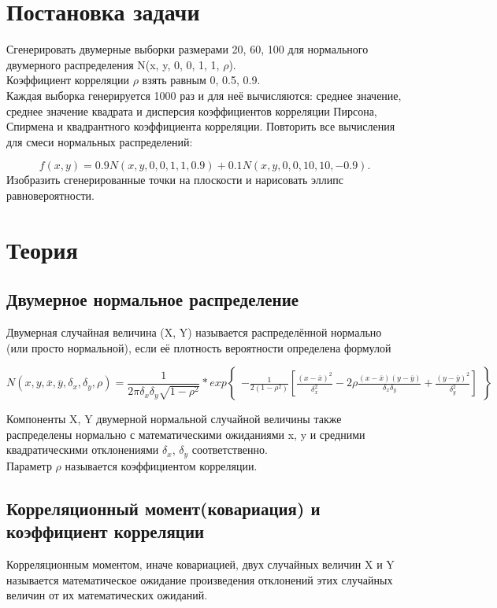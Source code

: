 \documentclass[a4]{article}
\begin{document}
	
	\newpage
	\tableofcontents{}
	\newpage
	\listoffigures
	\newpage
	\listoftables
	\newpage
	
	
	\section{Постановка задачи}
		Сгенерировать двумерные выборки размерами 20, 60, 100 для нормального двумерного распределения N(x, y, 0, 0, 1, 1, $\rho$).\\
		Коэффициент корреляции $\rho$ взять равным 0, 0.5, 0.9.\\
		Каждая выборка генерируется 1000 раз и для неё вычисляются: среднее значение, среднее значение квадрата и дисперсия коэффициентов корреляции Пирсона, Спирмена и квадрантного коэффициента корреляции.
		Повторить все вычисления для смеси нормальных распределений:

		$$f(x, y) = 0.9N(x, y, 0, 0, 1, 1, 0.9) + 0.1N(x, y, 0, 0, 10, 10, -0.9).$$
		Изобразить сгенерированные точки на плоскости и нарисовать эллипс равновероятности.
	\section{Теория}
		\subsection{Двумерное нормальное распределение}
			Двумерная случайная величина (X, Y) называется распределённой нормально (или просто нормальной), если её плотность вероятности определена
			формулой
			
			$$N(x, y, \overline{x}, \overline{y}, \delta_x, \delta_y, \rho) = \frac{1}{2\pi\delta_x\delta_y\sqrt{1 - \rho^2}} * exp\left\{
			\begin{array}{ccc}
			-\frac{1}{2(1 - \rho^2)} [\frac{(x - \overline{x})^2}{\delta^2_x} - 2\rho\frac{(x - \overline{x})(y - \overline{y})}{\delta_x \delta_y} + \frac{(y - \overline{y})^2}{\delta^2_y}]
			\end{array}
			\right\}$$
			
			Компоненты X, Y двумерной нормальной случайной величины также распределены нормально с математическими ожиданиями x, y и средними квадратическими отклонениями $\delta_x$, $\delta_y$ соответственно. \\
			Параметр $\rho$ называется коэффициентом корреляции.
		
		\subsection{Корреляционный момент(ковариация) и коэффициент корреляции}
			Корреляционным моментом, иначе ковариацией, двух случайных величин X и Y называется математическое ожидание произведения отклонений этих случайных величин от их математических ожиданий.
			
\end{document}
